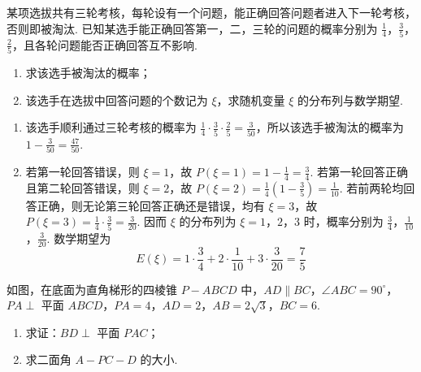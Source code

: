 \begin{problem}
某项选拔共有三轮考核，每轮设有一个问题，能正确回答问题者进入下一轮考核，否则即被淘汰. 已知某选手能正确回答第一，二，三轮的问题的概率分别为 \(\frac{1}{4}\)，\(\frac{3}{5}\)，\(\frac{2}{5}\)，且各轮问题能否正确回答互不影响.
\begin{enumerate}
\item 求该选手被淘汰的概率；
\item 该选手在选拔中回答问题的个数记为 \( \xi \)，求随机变量 \( \xi \) 的分布列与数学期望.
\end{enumerate}
\end{problem}

\begin{solution}
\begin{enumerate}
\item 该选手顺利通过三轮考核的概率为 \(\frac{1}{4}\cdot\frac{3}{5}\cdot\frac{2}{5}=\frac{3}{50}\)，所以该选手被淘汰的概率为 \(1-\frac{3}{50}=\frac{47}{50}\).
\item 若第一轮回答错误，则 \(\xi=1\)，故 \(P(\xi=1)=1-\frac{1}{4}=\frac{3}{4}\). 若第一轮回答正确且第二轮回答错误，则 \(\xi=2\)，故 \(P(\xi=2)=\frac{1}{4}\left(1-\frac{3}{5}\right)=\frac{1}{10}\). 若前两轮均回答正确，则无论第三轮回答正确还是错误，均有 \(\xi=3\)，故 \(P(\xi=3)=\frac{1}{4}\cdot\frac{3}{5}=\frac{3}{20}\). 因而 \(\xi\) 的分布列为 \(\xi=1\)，\(2\)，\(3\) 时，概率分别为 \(\frac{3}{4}\)，\(\frac{1}{10}\)，\(\frac{3}{20}\). 数学期望为
\[
E(\xi)=1\cdot\frac{3}{4}+2\cdot\frac{1}{10}+3\cdot\frac{3}{20}=\frac{7}{5}
\]
\end{enumerate}
\end{solution}

\begin{problem}
如图，在底面为直角梯形的四棱锥 \(P - ABCD\) 中，\(AD \parallel BC\)，\(\angle ABC = 90^\circ\)，\(PA \perp\) 平面 \(ABCD\)，\(PA = 4\)，\(AD = 2\)，\(AB = 2\sqrt{3}\)，\(BC = 6\).

\begin{enumerate}
\item 求证：\(BD \perp\) 平面 \(PAC\)；
\item 求二面角 \(A - PC - D\) 的大小.
\end{enumerate}

\end{problem}

